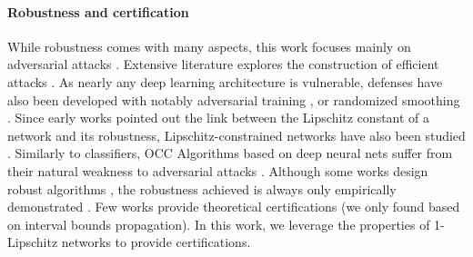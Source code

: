 
\paragraph{Robustness and certification} While robustness comes with many aspects, this work focuses mainly on adversarial attacks \cite{szegedy2013}. Extensive literature explores the construction of efficient attacks \cite{Goodfellow2014a} \cite{Brendel2018} \cite{carlini2017towards}. As nearly any deep learning architecture is vulnerable, defenses have also been developed with notably adversarial training \cite{madry2017towards} \cite{zhang2019theoretically}\cite{shafahi2019adversarial}, or randomized smoothing \cite{cohen2019certified}\cite{carlini2022certified}. Since early works pointed out the link between the Lipschitz constant of a network and its robustness, Lipschitz-constrained networks have also been studied \cite{anil2019sorting} \cite{serrurier2021achieving}.
Similarly to classifiers, OCC Algorithms based on deep neural nets suffer from their natural weakness to adversarial attacks \cite{occrobust}. Although some works design robust algorithms \cite{goyal_drocc_2020,lo_adversarially_2022}, the robustness achieved is always only empirically demonstrated \cite{hendrycks_benchmarking_2019}. Few works provide theoretical certifications (we only found \cite{bitterwolf_certifiably_2020} based on interval bounds propagation). In this work, we leverage the properties of 1-Lipschitz networks to provide certifications. 



